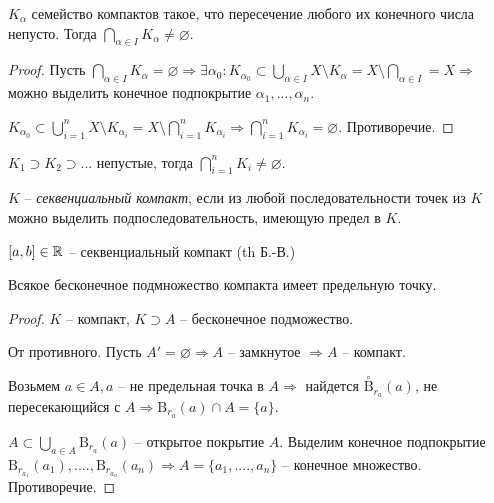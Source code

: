 \begin{theorem}
    $K_\alpha$ семейство компактов такое, что пересечение любого их конечного числа непусто. Тогда $\bigcap\limits_{\alpha \in I}K_\alpha \neq \varnothing$.
\end{theorem}

\begin{proof}
    Пусть $\bigcap\limits_{\alpha\in I}K_\alpha=\varnothing\Rightarrow\exists \alpha_0: K_{\alpha_0}\subset \bigcup\limits_{\alpha\in I} X\setminus K_\alpha = X \setminus \bigcap\limits_{\alpha\in I} = X\Rightarrow$ можно выделить конечное подпокрытие $\alpha_1, ..., \alpha_n$.

    $K_{\alpha_0}\subset \bigcup\limits_{i=1}^n X\setminus K_{\alpha_i} = X \setminus \bigcap\limits_{i = 1}^n K_{\alpha_i}\Rightarrow\bigcap\limits_{i = 1}^n K_{\alpha_i}=\varnothing$. Противоречие.
\end{proof}

\begin{corollary}
    $K_1\supset K_2\supset ...$ непустые, тогда $\bigcap\limits_{i = 1}^nK_i \neq \varnothing$.
\end{corollary}

\begin{definition}
    $K$ – \textit{секвенциальный компакт}, если из любой последовательности точек из $K$ можно выделить подпоследовательность, имеющую предел в $K$.
\end{definition}

\begin{example}
    $[a, b]\in \mathbb{R}$ – секвенциальный компакт (th Б.-В.)
\end{example}

\begin{theorem}
    Всякое бесконечное подмножество компакта имеет предельную точку.
\end{theorem}

\begin{proof}
    $K$ – компакт, $K\supset A$ – бесконечное подможество.

    От противного. Пусть $A'=\varnothing\Rightarrow A$ – замкнутое $\Rightarrow A$ – компакт.

    Возьмем $a\in A, a$ – не предельная точка в $A\Rightarrow$ найдется $ \overset{\circ}{\text{B}}_{r_a}(a)$, не пересекающийся с $A\Rightarrow\text{B}_{r_a}(a)\cap A=\{a\}$.

    $A\subset \bigcup\limits_{a\in A}\text{B}_{r_a}(a)$ – открытое покрытие $A$. Выделим конечное подпокрытие $\text{B}_{r_{a_1}}(a_1), . ..., \text{B}_{r_{a_n}}({a_n})\Rightarrow A=\{a_1, . ..., a_n\}$ – конечное множество. Противоречие.
\end{proof}

